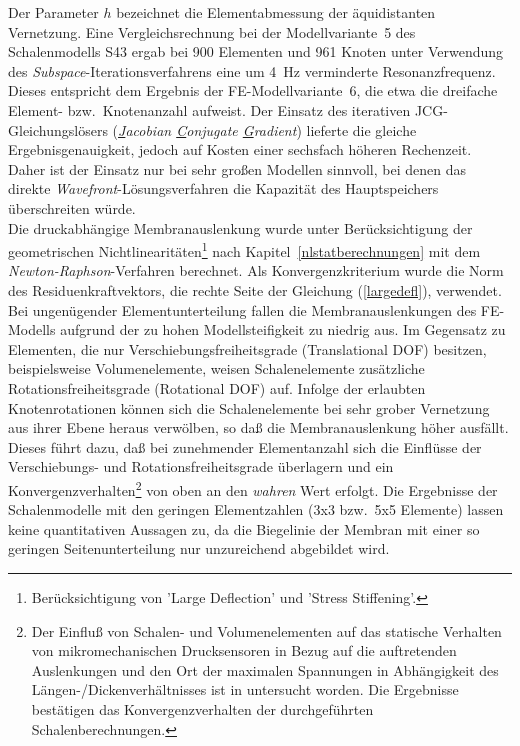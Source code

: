 Der Parameter $h$ bezeichnet die Elementabmessung der
äquidistanten Vernetzung.
Eine Vergleichsrechnung bei der Modellvariante~5 des Schalenmodells S43
ergab bei 900 Elementen und 961 Knoten unter Verwendung des
{\sl Subspace}-Iterationsverfahrens
eine um 4~Hz verminderte Resonanzfrequenz. Dieses entspricht dem Ergebnis
der FE-Modellvariante~6, die etwa die dreifache Element- bzw.\ Knotenanzahl
aufweist. Der Einsatz des iterativen JCG-Gleichungslösers
({\em \underline{J}acobian \underline{C}onjugate \underline{G}radient})
lieferte die
gleiche Ergebnisgenauigkeit, jedoch auf Kosten einer sechsfach höheren
Rechenzeit. Daher ist der Einsatz nur bei sehr großen Modellen sinnvoll,
bei denen das direkte {\sl Wavefront}-Lösungsverfahren die Kapazität des
Hauptspeichers überschreiten würde.\\
Die druckabhängige Membranauslenkung wurde unter Berücksichtigung der
geometrischen Nichtlinearitäten\footnote{Berücksichtigung von
'Large Deflection' und 'Stress Stiffening'.} nach
Kapitel~\ref{nlstatberechnungen} mit dem {\sl Newton-Raphson}-Verfahren
berechnet. Als Konvergenzkriterium wurde die Norm des Residuenkraftvektors,
die rechte Seite der Gleichung (\ref{largedefl}), verwendet.
Bei ungenügender Elementunterteilung fallen die Membranauslenkungen des
FE-Modells aufgrund der zu hohen Modellsteifigkeit zu niedrig aus.
Im Gegensatz zu Elementen, die nur Verschiebungsfreiheitsgrade
(Translational DOF) besitzen, beispielsweise Volumenelemente, weisen
Schalenelemente zusätzliche Rotationsfreiheitsgrade (Rotational DOF) auf.
Infolge der erlaubten Knotenrotationen können sich die Schalenelemente
bei sehr grober Vernetzung aus ihrer Ebene heraus verwölben, so daß die
Membranauslenkung höher ausfällt. Dieses führt dazu, daß bei zunehmender
Ele\-mentanzahl sich die Einflüsse der Verschiebungs- und
Rotationsfreiheitsgrade überlagern und ein
Konvergenzverhalten\footnote{Der
Einfluß von Schalen- und Volumenelementen auf das
statische Verhalten von mikromechanischen Drucksensoren in Bezug auf die
auftretenden Auslenkungen und den Ort der maximalen Spannungen in
Abhängigkeit des Längen-/Dickenverhältnisses ist in \cite{Tol92} untersucht
worden. Die Ergebnisse bestätigen das Konvergenzverhalten der durchgeführten
Schalenberechnungen.}
von oben an den {\em wahren} Wert erfolgt. Die Ergebnisse der Schalenmodelle
mit den geringen Elementzahlen (3x3 bzw.\ 5x5 Elemente) lassen keine
quantitativen Aussagen zu, da die Biegelinie der Membran mit einer so
geringen Seitenunterteilung nur unzureichend abgebildet wird.
